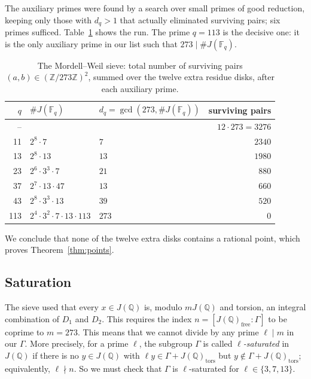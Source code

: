 \documentclass{article}
\theoremstyle{plain}
\newcommand{\Z}{\mathbb{Z}}
\newcommand{\Q}{\mathbb{Q}}
\newcommand{\F}{\mathbb{F}}
\newcommand{\tors}{\mathrm{tors}}
\begin{document}
The auxiliary primes were found by a search over small primes of good
reduction, keeping only those with $d_q>1$ that actually eliminated surviving
pairs; six primes sufficed. Table~\ref{tab:sieve} shows the run. The prime
$q=113$ is the decisive one: it is the only auxiliary prime in our list such that $273\mid\#J(\F_{q})$.

\begin{table}[ht]
\centering
\begin{tabular}{rllr}
\toprule
$q$ & $\#J(\F_q)$ & $d_q=\gcd(273,\#J(\F_q))$ & surviving pairs \\
\midrule
--  &             &      & $12\cdot 273=3276$ \\
11  & $2^8\cdot 7$              & $7$   & $2340$ \\
13  & $2^8\cdot 13$             & $13$  & $1980$ \\
23  & $2^6\cdot 3^3\cdot 7$     & $21$  & $880$  \\
37  & $2^7\cdot 13\cdot 47$     & $13$  & $660$  \\
43  & $2^8\cdot 3^3\cdot 13$    & $39$  & $520$  \\
113 & $2^4\cdot 3^2\cdot 7\cdot 13\cdot 113$ & $273$ & $0$ \\
\bottomrule
\end{tabular}
\caption{The Mordell--Weil sieve: total number of surviving pairs
$(a,b)\in(\Z/273\Z)^2$, summed over the twelve extra residue disks, after
each auxiliary prime.}
\label{tab:sieve}
\end{table}

We conclude that none of the twelve extra disks contains a
rational point, which proves Theorem~\ref{thm:points}.

\subsection{Saturation}

The sieve used that every $x\in J(\Q)$ is, modulo $mJ(\Q)$ and torsion, an
integral combination of $D_1$ and $D_2$. This requires the index
$n=[J(\Q)_{\mathrm{free}}:\Gamma]$ to be coprime to $m=273$. This means that we cannot divide by any prime \(\ell\mid m\) in our \(\Gamma\). More precisely, for a prime $\ell$, the subgroup $\Gamma$ is called
\emph{$\ell$-saturated} in $J(\Q)$ if there is no $y\in J(\Q)$ with
$\ell y\in\Gamma+J(\Q)_{\tors}$ but
$y\notin\Gamma+J(\Q)_{\tors}$; equivalently, $\ell\nmid n$. So we must
check that $\Gamma$ is $\ell$-saturated for $\ell\in\{3,7,13\}$.
\end{document}

